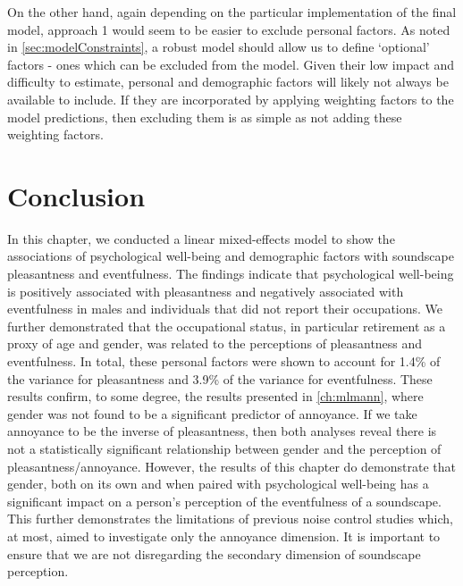 On the other hand, again depending on the particular implementation of the final model, approach 1 would seem to be easier to exclude personal factors. As noted in \cref{sec:modelConstraints}, a robust model should allow us to define `optional' factors - ones which can be excluded from the model. Given their low impact and difficulty to estimate, personal and demographic factors will likely not always be available to include. If they are incorporated by applying weighting factors to the model predictions, then excluding them is as simple as not adding these weighting factors. 

\section{Conclusion}
In this chapter, we conducted a linear mixed-effects model to show the associations of psychological well-being and demographic factors with soundscape pleasantness and eventfulness. The findings indicate that psychological well-being is positively associated with pleasantness and negatively associated with eventfulness in males and individuals that did not report their occupations. We further demonstrated that the occupational status, in particular retirement as a proxy of age and gender, was related to the perceptions of pleasantness and eventfulness. In total, these personal factors were shown to account for 1.4\% of the variance for pleasantness and 3.9\% of the variance for eventfulness. These results confirm, to some degree, the results presented in \cref{ch:mlmann}, where gender was not found to be a significant predictor of annoyance. If we take annoyance to be the inverse of pleasantness, then both analyses reveal there is not a statistically significant relationship between gender and the perception of pleasantness/annoyance. However, the results of this chapter do demonstrate that gender, both on its own and when paired with psychological well-being has a significant impact on a person's perception of the eventfulness of a soundscape. This further demonstrates the limitations of previous noise control studies which, at most, aimed to investigate only the annoyance dimension. It is important to ensure that we are not disregarding the secondary dimension of soundscape perception. 

